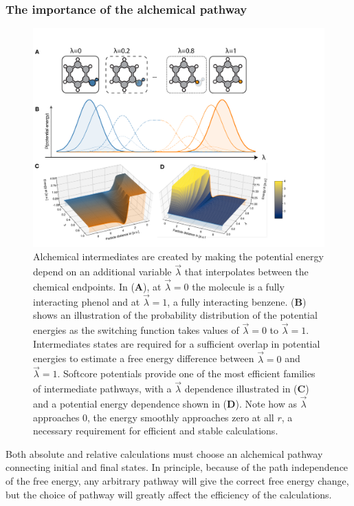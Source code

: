 \documentclass[9pt,bestpractices]{livecoms}
\begin{document}
\subsubsection{The importance of the alchemical pathway
\label{sec:important_path}}
\begin{figure}
    \includegraphics[width=0.95\linewidth]{figures/fig7_what_is_lam/Figure.pdf}
    \caption{Alchemical intermediates are created by making the potential energy depend on an additional variable $\vec{\lambda}$ that interpolates between the chemical endpoints. In (\textbf{A}), at $\vec{\lambda}=0$ the molecule is a fully interacting phenol and at $\vec{\lambda}=1$,  a fully interacting benzene. (\textbf{B}) shows an illustration of the probability distribution of the potential energies as the switching function takes values of $\vec{\lambda}=0$ to $\vec{\lambda}=1$. Intermediates states are required for a sufficient overlap in potential energies to estimate a free energy difference between $\vec{\lambda}=0$ and $\vec{\lambda}=1$.
    Softcore potentials provide one of the most efficient families of intermediate pathways, with a $\vec{\lambda}$ dependence illustrated in (\textbf{C}) and a potential energy dependence shown in (\textbf{D}). Note how as $\vec{\lambda}$ approaches 0, the energy smoothly approaches zero at all $r$, a necessary requirement for efficient and stable calculations.  }
    \label{fig:fig_what_is_lambda}
\end{figure}
%
Both absolute and relative calculations must choose an alchemical pathway connecting initial and final states. In principle, because of the path independence of the free energy, any arbitrary pathway will give the correct free energy change, but the choice of pathway will greatly affect the efficiency of the calculations. 
\end{document}
